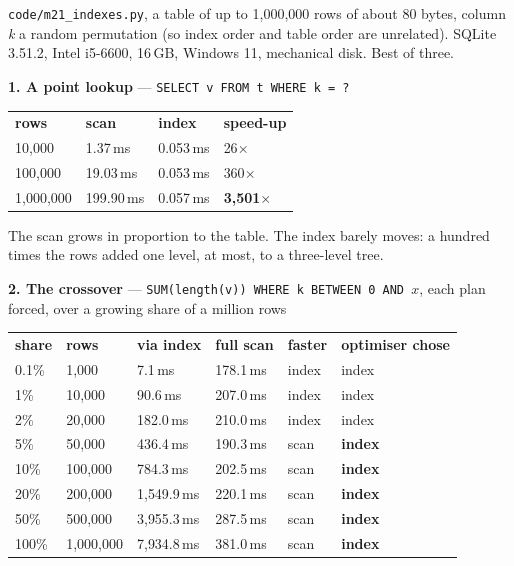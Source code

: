 \begin{measured}
\textsf{\footnotesize \texttt{code/m21\_indexes.py}, a table of up to
1{,}000{,}000 rows of about 80 bytes, column \textit{k} a random permutation
(so index order and table order are unrelated). SQLite 3.51.2, Intel i5-6600,
16\,GB, Windows 11, mechanical disk. Best of three.}

\medskip
\textbf{1. A point lookup} --- \texttt{SELECT v FROM t WHERE k = ?}

\begin{tabular}{@{}R{2.6cm}R{2.6cm}R{2.6cm}R{2.6cm}@{}}
\textbf{rows} & \textbf{scan} & \textbf{index} & \textbf{speed-up} \\
10{,}000    & 1.37\,ms   & 0.053\,ms & 26$\times$ \\
100{,}000   & 19.03\,ms  & 0.053\,ms & 360$\times$ \\
1{,}000{,}000 & 199.90\,ms & 0.057\,ms & \textbf{3{,}501$\times$} \\
\end{tabular}

\smallskip
The scan grows in proportion to the table. The index barely moves: a hundred
times the rows added one level, at most, to a three-level tree.

\medskip
\textbf{2. The crossover} --- \texttt{SUM(length(v)) WHERE k BETWEEN 0 AND
}$x$, each plan forced, over a growing share of a million rows

\begin{tabular}{@{}R{1.6cm}R{2.2cm}R{2.4cm}R{2.4cm}L{1.6cm}L{2.6cm}@{}}
\textbf{share} & \textbf{rows} & \textbf{via index} & \textbf{full scan}
& \textbf{faster} & \textbf{optimiser chose} \\
0.1\% & 1{,}000    & 7.1\,ms    & 178.1\,ms & index & index \\
1\%   & 10{,}000   & 90.6\,ms   & 207.0\,ms & index & index \\
2\%   & 20{,}000   & 182.0\,ms  & 210.0\,ms & index & index \\
5\%   & 50{,}000   & 436.4\,ms  & 190.3\,ms & scan  & \textbf{index} \\
10\%  & 100{,}000  & 784.3\,ms  & 202.5\,ms & scan  & \textbf{index} \\
20\%  & 200{,}000  & 1{,}549.9\,ms & 220.1\,ms & scan & \textbf{index} \\
50\%  & 500{,}000  & 3{,}955.3\,ms & 287.5\,ms & scan & \textbf{index} \\
100\% & 1{,}000{,}000 & 7{,}934.8\,ms & 381.0\,ms & scan & \textbf{index} \\
\end{tabular}


\end{measured}
